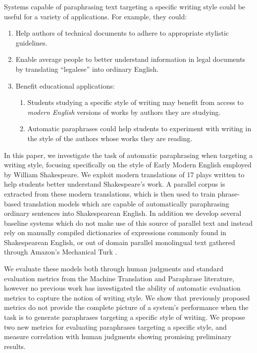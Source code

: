 \documentclass[10pt,a5paper,twoside]{article}
\begin{document}
Systems capable of paraphrasing text targeting a specific writing style could be useful for a variety of applications.  For example, they could:
\begin{enumerate}
  \item Help authors of technical documents to adhere to appropriate stylistic guidelines.  
  \item Enable average people to better understand information in legal documents by translating ``legalese'' into ordinary English.  
  \item Benefit educational applications:
    \begin{enumerate}
    \item Students studying a specific style of writing may benefit from access to \emph{modern English} versions of works by authors they are studying.
    \item Automatic paraphrases could help students to experiment with writing in the style of the authors whose works they are reading.
    \end{enumerate}
\end{enumerate}

In this paper, we investigate the task of automatic paraphrasing when targeting a writing style, focusing specifically on the style of Early Modern English employed by William Shakespeare.
We exploit modern translations of 17 plays written to help students better understand Shakespeare's work.  A parallel corpus is extracted from these modern translations,
which is then used to train phrase-based translation models which are capable of automatically paraphrasing ordinary sentences into Shakespearean English.  In addition we develop several
baseline systems which do not make use of this source of parallel text and instead rely on manually compiled dictionaries of expressions commonly found in Shakespearean English, or out of
domain parallel monolingual text gathered through Amazon's Mechanical Turk \cite{chen11}.

We evaluate these models both through human judgments and standard evaluation metrics from the Machine Translation and Paraphrase literature, however no previous work has investigated the ability of automatic
evaluation metrics to capture the notion of writing style.  
We show that previously proposed metrics do not provide the complete picture of a system's performance when the task is to generate paraphrases
targeting a specific style of writing.  We propose two new metrics for evaluating paraphrases targeting a specific style, and measure correlation with human judgments showing promising
preliminary results.
\end{document}
